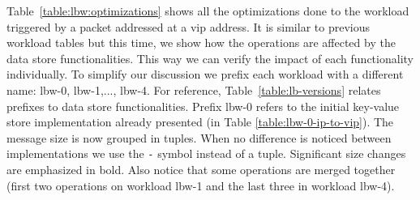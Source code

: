 \begin{figure}[ht]
\begin{floatrow}
\end{floatrow}
\end{figure}

Table~\ref{table:lbw:optimizations} shows all the optimizations done to the 
workload triggered by a packet addressed at a \gls{vip}
address.
It is similar to previous workload tables but this time, we show how the operations are affected by the data store functionalities. 
This way we can verify the impact of each functionality individually. To simplify our discussion we prefix each workload with a different name: lbw-0, lbw-1,..., lbw-4. 
For reference, Table~\ref{table:lb-versions} relates prefixes to data store functionalities. 
Prefix lbw-0 refers to the initial key-value store implementation already presented (in Table \ref{table:lbw-0-ip-to-vip}). 
The message size is now grouped in tuples.
When no difference is noticed between implementations we use the \texttt{-} symbol instead of a tuple. 
Significant size changes are emphasized  in bold. 
Also notice that some operations are merged together (first two operations on workload lbw-1 and the last three in workload lbw-4).

